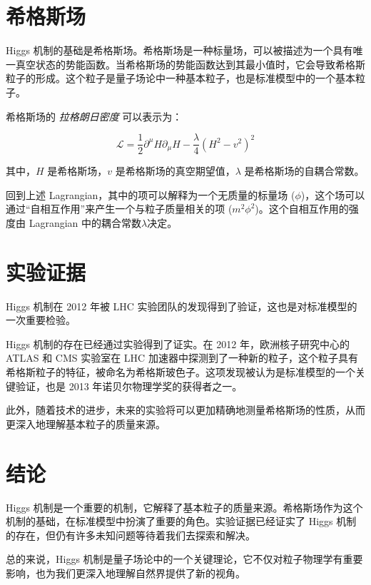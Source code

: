 \documentclass[oneside,a4paper,openany,11pt]{ctexbook}
\begin{document}
\section{希格斯场}

Higgs 机制的基础是希格斯场。希格斯场是一种标量场，可以被描述为一个具有唯一真空状态的势能函数。当希格斯场的势能函数达到其最小值时，它会导致希格斯粒子的形成。这个粒子是量子场论中一种基本粒子，也是标准模型中的一个基本粒子。

希格斯场的 \emph{拉格朗日密度} 可以表示为：

\begin{equation}
    \mathcal{L}=\frac{1}{2} \partial^\mu H \partial_\mu H - \frac{\lambda}{4} \left(H^2-v^2\right)^2
\end{equation}

\noindent 其中，$H$ 是希格斯场，$v$ 是希格斯场的真空期望值，$\lambda$ 是希格斯场的自耦合常数。

回到上述 Lagrangian，其中的项可以解释为一个无质量的标量场 ($\phi$)，这个场可以通过“自相互作用”来产生一个与粒子质量相关的项 ($m^2\phi^2$)。这个自相互作用的强度由 Lagrangian 中的耦合常数$\lambda$决定。

\section{实验证据}

Higgs 机制在 2012 年被 LHC 实验团队的发现得到了验证，这也是对标准模型的一次重要检验。

Higgs 机制的存在已经通过实验得到了证实。在 2012 年，欧洲核子研究中心的 ATLAS 和 CMS 实验室在 LHC 加速器中探测到了一种新的粒子，这个粒子具有希格斯粒子的特征，被命名为希格斯玻色子。这项发现被认为是标准模型的一个关键验证，也是 2013 年诺贝尔物理学奖的获得者之一。

此外，随着技术的进步，未来的实验将可以更加精确地测量希格斯场的性质，从而更深入地理解基本粒子的质量来源。

\section{结论}

Higgs 机制是一个重要的机制，它解释了基本粒子的质量来源。希格斯场作为这个机制的基础，在标准模型中扮演了重要的角色。实验证据已经证实了 Higgs 机制的存在，但仍有许多未知问题等待着我们去探索和解决。

总的来说，Higgs 机制是量子场论中的一个关键理论，它不仅对粒子物理学有重要影响，也为我们更深入地理解自然界提供了新的视角。
\end{document}
